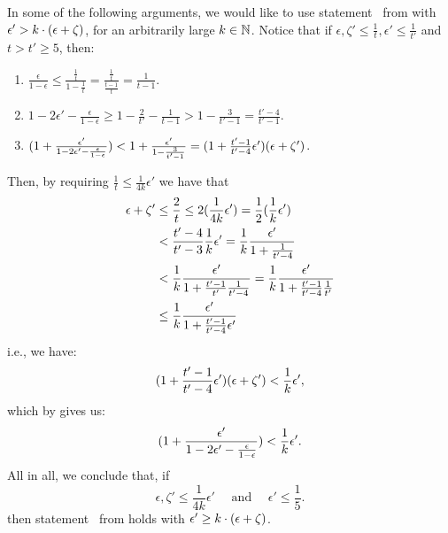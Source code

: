         \begin{remark} \label{rmk:value_for_even_partition_of_excellent_parts}
            In some of the following arguments, we would like to use statement ~from
             with $\epsilon' > k \cdot ( \epsilon + \zeta )$, for an arbitrarily large $k \in \mathbb{N}$.
            Notice that if $\epsilon, \zeta' \leq \frac{1}{t}, \epsilon' \leq \frac{1}{t'}$ and $t > t' \geq 5$, then:
            \begin{enumerate}[label=(\alph*), ref=\alph*]
                \item $\frac{\epsilon}{1-\epsilon} \leq \frac{\frac{1}{t}}{1-\frac{1}{t}} = \frac{\frac{1}{t}}{\frac{t-1}{t}}
                    = \frac{1}{t-1}$.
                \item $1 - 2 \epsilon' - \frac{\epsilon}{1-\epsilon} \geq 1 - \frac{2}{t'} - \frac{1}{t-1} > 1 - \frac{3}{t'-1}
                    = \frac{t'-4}{t'-1}$.
                \item \label{itm:value_for_even_partition_of_excellent_parts.c} $( 1 + \frac{\epsilon'}{1 - 2 \epsilon' - \frac{\epsilon}{1-\epsilon}} )
                    < 1 + \frac{\epsilon'}{1 - \frac{3}{t'-1}}
                    = ( 1 + \frac{t'-1}{t'-4} \epsilon' ) ( \epsilon + \zeta' )$.
            \end{enumerate}
            Then, by requiring $\frac{1}{t} \leq \frac{1}{4k}\epsilon'$ we have that
            \begin{align*}
                \epsilon + \zeta'
                    & \leq \frac{2}{t} \leq 2 ( \frac{1}{4k}\epsilon' ) = \frac{1}{2} ( \frac{1}{k}\epsilon' ) \\
                    & < \frac{t'-4}{t'- 3} \frac{1}{k} \epsilon' = \frac{1}{k} \frac{\epsilon'}{1 + \frac{1}{t'-4}} \\
                    & < \frac{1}{k} \frac{\epsilon'}{1 + \frac{t'-1}{t'}\frac{1}{t'-4}} = \frac{1}{k} \frac{\epsilon'}{1 + \frac{t'-1}{t'-4}\frac{1}{t'}} \\
                    & \leq \frac{1}{k} \frac{\epsilon'}{1 + \frac{t'-1}{t'-4}\epsilon'}
            \end{align*}
            i.e., we have:
            \[
                ( 1 + \frac{t'-1}{t'-4} \epsilon' ) ( \epsilon + \zeta' ) < \frac{1}{k} \epsilon',
            \]
            which by  gives us:
            \[
                ( 1 + \frac{\epsilon'}{1 - 2 \epsilon' - \frac{\epsilon}{1-\epsilon}} ) < \frac{1}{k} \epsilon'.
            \]
            All in all, we conclude that, if
            \[
                \epsilon, \zeta' \leq \frac{1}{4k} \epsilon' \quad \text{ and } \quad \epsilon' \leq \frac{1}{5}.
            \]
            then statement ~from
             holds with $\epsilon' \geq k \cdot ( \epsilon + \zeta )$.
        \end{remark}

